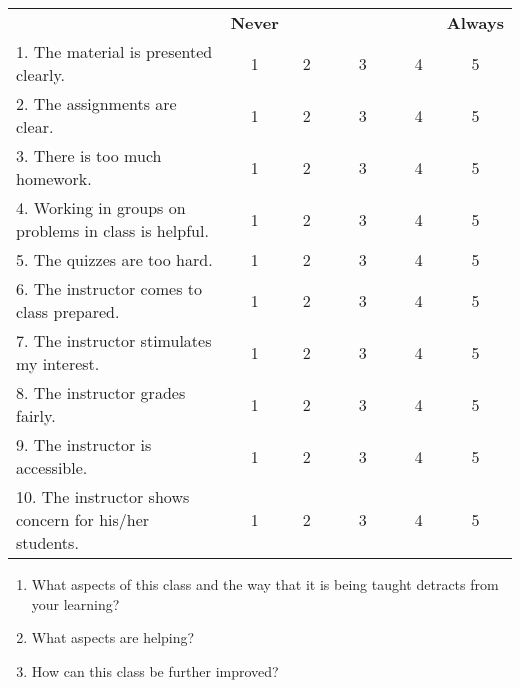 \thispagestyle{empty}



\bigskip
\bigskip


\bigskip
\noindent\begin{tabular}{lccccc}
& {\bf Never} & & & & {\bf Always} \\
1. The material is presented clearly. & 1 & ~2~~ & ~~3~~ & ~~4~ &
~~5~~ \\
2. The assignments are clear.& 1 & ~2~~ & ~~3~~ & ~~4~ &
~~5~~ \\  
3. There is too much homework. & 1 & ~2~~ & ~~3~~ & ~~4~ &
~~5~~ \\
4. Working in groups on problems in class is helpful.& 1 & ~2~~ & ~~3~~ & ~~4~ &
~~5~~ \\
5. The quizzes are too hard. & 1 & ~2~~ & ~~3~~ & ~~4~ &
~~5~~ \\
6. The instructor comes to class prepared. & 1 & ~2~~ & ~~3~~ & ~~4~ &
~~5~~ \\
7. The instructor stimulates my interest.& 1 & ~2~~ & ~~3~~ & ~~4~ &
~~5~~ \\
8. The instructor grades fairly.& 1 & ~2~~ & ~~3~~ & ~~4~ &
~~5~~ \\
9. The instructor is accessible.& 1 & ~2~~ & ~~3~~ & ~~4~ &
~~5~~ \\
10. The instructor shows concern for his/her students. & 1 & ~2~~ & ~~3~~ & ~~4~ &
~~5~~ \\
\end{tabular}

\bigskip
\bigskip


\bigskip

\begin{enumerate}
\item What aspects of this class and the way that it is being taught
detracts from your learning?

\vspace{1.75in}

\item What aspects are helping?

\vspace{1.75in}

\item How can this class be further improved?

\end{enumerate}








